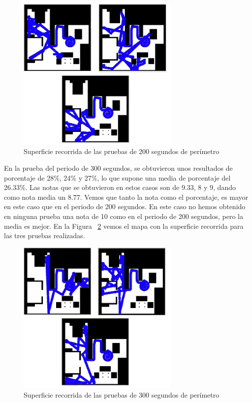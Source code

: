 \begin{figure}[H]
  \begin{center}
    \includegraphics[width=0.7\textwidth]{figures/Vacuum/Referee200.png}
		\caption{Superficie recorrida de las pruebas de 200 segundos de perímetro}
		\label{fig.Referee200}
		\end{center}
\end{figure}

En la prueba del periodo de 300 segundos, se obtuvieron unos resultados de porcentaje de 28\%, 24\% y 27\%, lo que supone una media de porcentaje del 26.33\%. Las notas que se obtuvieron en estos casos son de 9.33, 8 y 9, dando como nota media un 8.77. Vemos que tanto la nota como el porcentaje, es mayor en este caso que en el periodo de 200 segundos. En este caso no hemos obtenido en ninguna prueba una nota de 10 como en el periodo de 200 segundos, pero la media es mejor. En la Figura ~\ref{fig.Referee300} vemos el mapa con la superficie recorrida para las tres pruebas realizadas.

\begin{figure}[H]
  \begin{center}
    \includegraphics[width=0.7\textwidth]{figures/Vacuum/Referee300.png}
		\caption{Superficie recorrida de las pruebas de 300 segundos de perímetro}
		\label{fig.Referee300}
		\end{center}
\end{figure}

